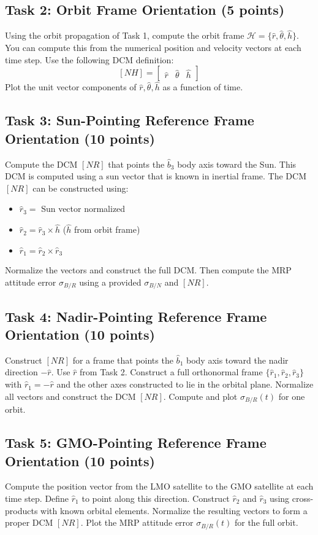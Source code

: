 \documentclass[12pt]{article}
\begin{document}
\subsection{Task 2: Orbit Frame Orientation (5 points)}
Using the orbit propagation of Task 1, compute the orbit frame \(\mathcal{H} = \{\hat{r}, \hat{\theta}, \hat{h}\}\). You can compute this from the numerical position and velocity vectors at each time step. Use the following DCM definition:
\[
[NH] = \begin{bmatrix} \hat{r} & \hat{\theta} & \hat{h} \end{bmatrix}
\]
Plot the unit vector components of \(\hat{r}, \hat{\theta}, \hat{h}\) as a function of time.

\subsection{Task 3: Sun-Pointing Reference Frame Orientation (10 points)}
Compute the DCM \([NR]\) that points the \(\hat{b}_3\) body axis toward the Sun. This DCM is computed using a sun vector that is known in inertial frame. The DCM \([NR]\) can be constructed using:
\begin{itemize}
  \item \(\hat{r}_3 = \) Sun vector normalized
  \item \(\hat{r}_2 = \hat{r}_3 \times \hat{h}\) (\(\hat{h}\) from orbit frame)
  \item \(\hat{r}_1 = \hat{r}_2 \times \hat{r}_3\)
\end{itemize}
Normalize the vectors and construct the full DCM. Then compute the MRP attitude error \(\sigma_{B/R}\) using a provided \(\sigma_{B/N}\) and \([NR]\).

\subsection{Task 4: Nadir-Pointing Reference Frame Orientation (10 points)}
Construct \([NR]\) for a frame that points the \(\hat{b}_1\) body axis toward the nadir direction \( -\hat{r} \). Use \(\hat{r}\) from Task 2. Construct a full orthonormal frame \(\{\hat{r}_1, \hat{r}_2, \hat{r}_3\}\) with \(\hat{r}_1 = -\hat{r}\) and the other axes constructed to lie in the orbital plane. Normalize all vectors and construct the DCM \([NR]\). Compute and plot \(\sigma_{B/R}(t)\) for one orbit.

\subsection{Task 5: GMO-Pointing Reference Frame Orientation (10 points)}
Compute the position vector from the LMO satellite to the GMO satellite at each time step. Define \(\hat{r}_1\) to point along this direction. Construct \(\hat{r}_2\) and \(\hat{r}_3\) using cross-products with known orbital elements. Normalize the resulting vectors to form a proper DCM \([NR]\). Plot the MRP attitude error \(\sigma_{B/R}(t)\) for the full orbit.
\end{document}
